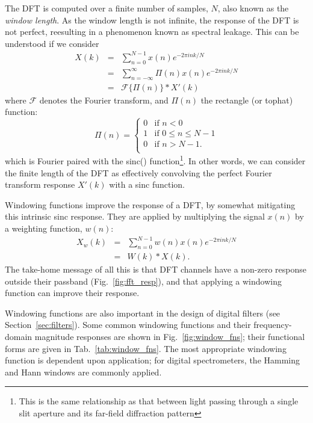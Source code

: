 \documentclass{ws-rv961x669}
\begin{document}
The DFT is computed over a finite number of samples, $N$, also known as the \emph{window length}. As the window length is not infinite, the response of the DFT is not perfect, reesulting in a phenomenon known as spectral leakage. This can be understood if we consider
\begin{eqnarray}
X(k) & = & \sum_{n=0}^{N-1}x(n)e^{-2\pi ink/N} \\
     & = &  \sum_{n=-\infty}^{\infty} \Pi (n)x(n)e^{-2\pi ink/N}\\
     & = & \mathcal{F}\{\Pi(n)\}*X'(k)
\end{eqnarray}
where $\mathcal{F}$ denotes the Fourier transform, and $\Pi(n)$ the rectangle (or tophat) function:
\begin{equation}
\Pi(n) = \begin{cases}
	0 & \mbox{if } n < 0 \\
	1 & \mbox{if } 0 \leq n \leq N-1 \\
	0 & \mbox{if } n > N-1. \\
\end{cases}	
\end{equation}
which is Fourier paired with the sinc() function\footnote{This is the same relationship as that between light passing through a single slit aperture and its far-field diffraction pattern}. In other words, we can consider the finite length of the DFT as effectively convolving the perfect Fourier transform response $X'(k)$ with a sinc function.  

Windowing functions\citet{SvenGade1987} improve the response of a DFT, by somewhat mitigating this intrinsic sinc response. They are applied by multiplying the signal $x(n)$ by a weighting function, $w(n)$:
\begin{eqnarray}
X_w(k) & = & \sum_{n=0}^{N-1}w(n)x(n)e^{-2\pi ink/N} \\
       & = & W(k)*X(k).
\end{eqnarray}
The take-home message of all this is that DFT channels have a non-zero response outside their passband (Fig.~\ref{fig:fft_resp}), and that applying a windowing function can improve their response.

Windowing functions are also important in the design of digital filters (see Section~\ref{sec:filters}). Some common windowing functions and their frequency-domain magnitude responses are shown in Fig.~\ref{fig:window_fns}; their functional forms are given in Tab.~\ref{tab:window_fns}. The most appropriate windowing function is dependent upon application; for digital spectrometers, the Hamming and Hann windows are commonly applied.
\end{document}
